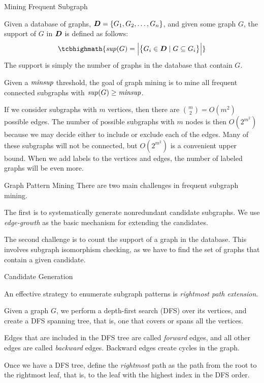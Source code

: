 \begin{frame}{Mining Frequent Subgraph}

Given a database of graphs, ${\boldsymbol D} = \{
G_1, G_2, \ldots, G_n\}$, and given some graph $G$, the support of
$G$ in ${\boldsymbol D}$ is def\/{i}ned as follows:
\begin{align*}
\tcbhighmath{
    \supp(G) = \bcard{\Big}{\bigl\{ G_i \in \bD \mid
    G \subseteq G_i\bigr\}}
}
\end{align*}
The support is simply the number of graphs in the database that
contain $G$. 

Given a $\mathit{minsup}$ threshold, the goal of graph
mining is to mine all frequent connected subgraphs
with $\mathit{sup}(G) \ge \mathit{minsup}$.

\bigskip
If we consider subgraphs with $m$ vertices, then there are ${m \choose 2} =
O(m^2)$ possible edges. The number of possible subgraphs with $m$ nodes
is then $O(2^{m^2})$ because we may decide either to include or exclude
each of the edges.  Many of these subgraphs will not be connected, but
$O(2^{m^2})$ is a convenient upper bound.  When we add labels to the vertices
and edges, the number of labeled graphs will be even more. 
\end{frame}


\begin{frame}{Graph Pattern Mining}
There are two main challenges in frequent subgraph mining. 


\bigskip
The f\/{i}rst is
to systematically generate nonredundant candidate subgraphs. We use {\em edge-growth}
as the basic mechanism for extending
the candidates. 

\bigskip
The second challenge is to count the support of a graph in the
database. This involves subgraph isomorphism checking, as we have to
f\/{i}nd the set of graphs that contain a given candidate.
\end{frame}


\begin{frame}{Candidate Generation}

An effective strategy to enumerate subgraph patterns is
{\em rightmost path extension}.

\medskip
Given a graph $G$, we perform a
depth-f\/{i}rst search (DFS) over its vertices, and create a DFS spanning
tree, that is, one that covers or spans all the vertices.

\medskip
Edges that are included in the DFS tree are called
{\em forward} edges, and all other edges are called {\em backward}
edges. Backward edges create cycles in the graph.

\medskip
Once we have a DFS tree, def\/{i}ne the {\em rightmost} path as the
path from the root to the rightmost leaf,
that is, to the leaf with the
highest index in the DFS order.
\end{frame}


